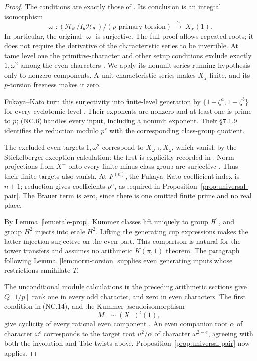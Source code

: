 \documentclass[11pt,a4paper]{article}
\theoremstyle{definition}
\begin{document}
\begin{proof}
The conditions are exactly those of
\cite[Corollary~8.1.3(2), p.~49]{WakeWangEricksonPseudo2018}.
Its conclusion is an integral isomorphism
\[
 \varpi:
 (\mathcal H^-_\theta/I_\theta\mathcal H^-_\theta)/
           (p\text{-primary torsion})
       \ \xrightarrow{\ \sim\ }\ X_\chi(1).
\]
In particular, the original \(\varpi\) is surjective.
The full proof allows repeated roots; it does not require the
derivative of the characteristic series to be invertible.
At tame level one the primitive-character and other setup
conditions exclude exactly \(1,\omega^2\) among the even
characters \cite[\S1.1, pp.~2--3]{WakeWangEricksonPseudo2018}.
We apply its nonunit-series running hypothesis only to nonzero
components.  A unit characteristic series makes \(X_\chi\)
finite, and its \(p\)-torsion freeness makes it zero.

Fukaya--Kato turn this surjectivity into finite-level generation
by \(\{1-\zeta^a,1-\zeta^b\}\) for every cyclotomic level
\cite[\S\S7.1.8--7.1.10, p.~86]{FukayaKato2012}.
Their exponents are nonzero and at least one is prime to \(p\);
(NC.6) handles every input, including a nonunit exponent.
Their \S7.1.9 identifies the reduction modulo \(p^r\) with
the corresponding class-group quotient.

The excluded even targets \(1,\omega^2\) correspond to
\(X_{\omega^{-1}},X_\omega\), which vanish by the
Stickelberger exception calculation; the first is explicitly
recorded in \cite[proof of Lemma~5.2.7, p.~13]{WakeWangErickson2017}.
Norm projections from \(X^-\) onto every finite minus class
group are surjective
\cite[Proposition~3.4.1 and proof, pp.~90--91]{SharifiIwasawaNotes}.
Thus their finite targets also vanish.  At \(F^{(n)}\), the
Fukaya--Kato coefficient index is \(n+1\); reduction gives
coefficients \(p^n\), as required in
Proposition~\ref{prop:universal-pair}.  The Brauer term is zero,
since there is one omitted finite prime and no real place.

By Lemma~\ref{lem:etale-prop}, Kummer classes lift uniquely to
group \(H^1\), and group \(H^2\) injects into etale \(H^2\).
Lifting the generating cup expressions makes the latter
injection surjective on the even part.  This comparison is
natural for the tower transfers and assumes no arithmetic
\(K(\pi,1)\) theorem.  The paragraph following
Lemma~\ref{lem:norm-torsion} supplies even generating inputs
whose restrictions annihilate \(T\).

The unconditional module calculations in the preceding
arithmetic sections give \(Q[1/p]\) rank one in every odd
character, and zero in even characters.  The first condition
in (NC.14), and the Kummer pseudoisomorphism
\[
                         M^+\sim(X^-)^\iota(1),
\]
give cyclicity of every rational even component
\cite[Proposition~3.4.7 and Corollary~3.4.8, p.~92]{SharifiIwasawaNotes}.
An even companion root \(\alpha\) of character \(\omega^e\)
corresponds to the target root \(u^2/\alpha\) of character
\(\omega^{2-e}\), agreeing with both the involution and Tate
twists above.  Proposition~\ref{prop:universal-pair} now applies.
\end{proof}
\end{document}
